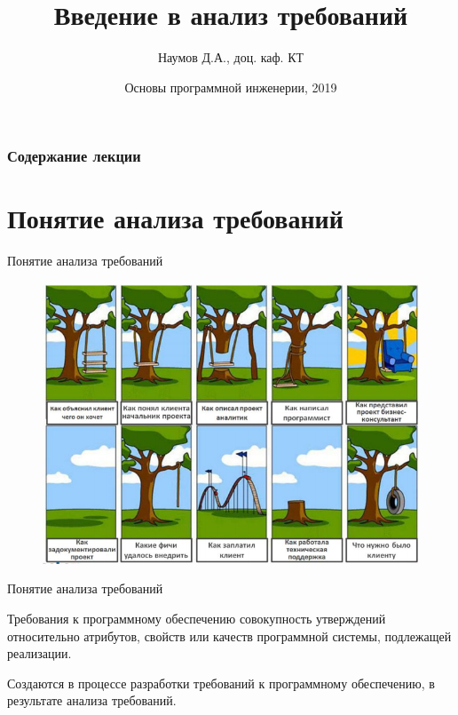 \documentclass{beamer}
\title[Software Design]{Введение в анализ требований}
\author{Наумов Д.А., доц. каф. КТ}
\date[10.09.2019] {Основы программной инженерии, 2019}
\begin{document}
\begin{frame}
  \titlepage
\end{frame}
  
\begin{frame}
  \frametitle{Содержание лекции}
  \tableofcontents  
\end{frame}
  
\section{Понятие анализа требований}

\begin{frame}[t]{Понятие анализа требований}
\begin{figure}[h]
\centering
\includegraphics[scale=0.5]{images/lec02-pic01.png}
\end{figure}
\end{frame} 

\begin{frame}[t]{Понятие анализа требований}
\begin{block}{Требования к программному обеспечению}
совокупность утверждений относительно атрибутов, свойств или качеств программной системы, подлежащей реализации. \end{block}
Создаются в процессе разработки требований к программному обеспечению, в результате анализа требований.
\end{frame}
\end{document}
